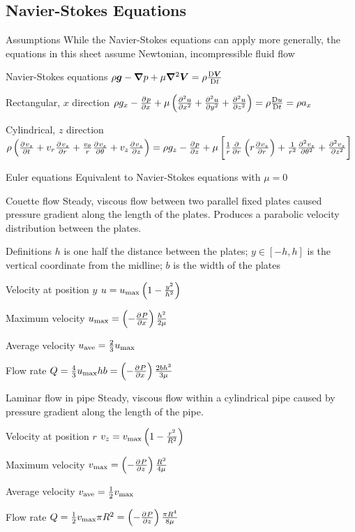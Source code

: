 \documentclass{article}
\begin{document}
\subsection{Navier-Stokes Equations}
\begin{description*}
\item[Assumptions] While the Navier-Stokes equations can apply more generally, the equations in this
  sheet assume Newtonian, incompressible fluid flow
\item[Navier-Stokes equations]
  \(\rho\vec{g} - \del p + \mu\del^2\vec{V} = \rho\frac{\Dif\vec V}{\Dif t}\)
  \begin{description*}
  \item[Rectangular, $x$ direction]
    \(\rho g_x - \pd{p}{x} + \mu\left(\pd[2]{u}{x}+\pd[2]{u}{y}+\pd[2]{u}{z}\right)
    = \rho\frac{\Dif u}{\Dif t} = \rho a_x\)
  \item[Cylindrical, $z$ direction]
    \(\rho\left(\pd{v_z}{t}+v_r\pd{v_z}{r}+\frac{v_\theta}{r}\pd{v_z}{\theta}+v_z\pd{v_z}{z}\right)
    = \rho g_z - \pd{p}{z}
    + \mu\left[\frac{1}{r}\pd{}{r}\left(r\pd{v_z}{r}\right)
      + \frac{1}{r^2}\pd[2]{v_z}{\theta}
      + \pd[2]{v_z}{z}\right]\)
  \end{description*}
\item[Euler equations] Equivalent to Navier-Stokes equations with $\mu=0$
\item[Couette flow] Steady, viscous flow between two parallel fixed plates caused pressure gradient
  along the length of the plates. Produces a parabolic velocity distribution between the plates.
  \begin{description*}
  \item[Definitions] $h$ is one half the distance between the plates;
    $y\in[-h,h]$ is the vertical coordinate from the midline;
    $b$ is the width of the plates
  \item[Velocity at position $y$]
    \(u = u_{\mathrm{max}}\left(1-\frac{y^2}{h^2}\right)\)
  \item[Maximum velocity]
    \(u_\mrm{max} = \left(-\pd{P}{x}\right)\frac{h^2}{2\mu}\)
  \item[Average velocity]
    \(u_{\mathrm{ave}} = \frac{2}{3}u_{\mathrm{max}}\)
  \item[Flow rate]
    \(Q = \frac{4}{3}u_\mrm{max}hb = \left(-\pd{P}{x}\right)\frac{2bh^3}{3\mu}\)
  \end{description*}
\item[Laminar flow in pipe] Steady, viscous flow within a cylindrical pipe caused by pressure
  gradient along the length of the pipe.
  \begin{description*}
  \item[Velocity at position $r$]
    \(v_z = v_{\mathrm{max}}\left(1 - \frac{r^2}{R^2}\right)\)
  \item[Maximum velocity]
    \(v_\mrm{max} = \left(-\pd{P}{z}\right)\frac{R^2}{4\mu}\)
  \item[Average velocity]
    \(v_{\mathrm{ave}} = \frac{1}{2}v_{\mathrm{max}}\)
  \item[Flow rate]
    \(Q = \frac{1}{2}v_\mrm{max}\pi R^2 = \left(-\pd{P}{z}\right)\frac{\pi R^4}{8\mu}\)
  \end{description*}
\end{description*}
\end{document}
